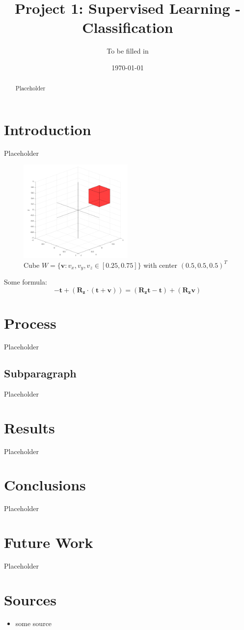 \documentclass[a4paper,12pt]{article}
\title{Project 1: Supervised Learning - Classification}
\author{To be filled in}
\date{\today}
\begin{document}
\maketitle

\begin{abstract}
Placeholder
\end{abstract}

\section{Introduction}
Placeholder

\begin{figure}[h]
    \centering
    \includegraphics[width=0.5\textwidth]{cube.png}
    \caption{Cube \( W = \{\mathbf{v}: v_x, v_y, v_z
\in [0.25, 0.75] \} \) with center \( (0.5, 0.5, 0.5)^T\)}
    \label{fig:Introduction}
\end{figure}

Some formula:
\[ \mathbf{-t} + (\mathbf{R_z} \cdot (\mathbf{t} + \mathbf{v} )) = 
    (\mathbf{R_z}\mathbf{t} - \mathbf{t}) + (\mathbf{R_z}\mathbf{v})\]


\section{Process}
Placeholder

\subsection{Subparagraph}
Placeholder

\section{Results}
Placeholder

\section{Conclusions}
Placeholder

\section{Future Work}
Placeholder


\clearpage

\section{Sources}

\begin{itemize}
    \item some source
\end{itemize}
\end{document}
